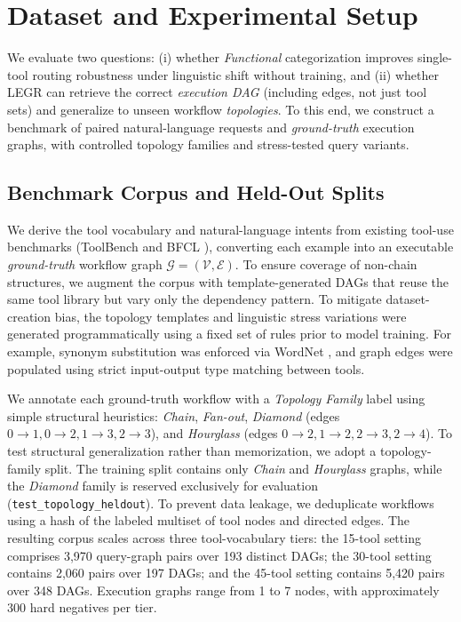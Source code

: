 \documentclass{article}
\begin{document}
\section{Dataset and Experimental Setup}

We evaluate two questions: (i) whether \emph{Functional} categorization improves single-tool routing robustness under linguistic shift without training, and (ii) whether LEGR can retrieve the correct \emph{execution DAG} (including edges, not just tool sets) and generalize to unseen workflow \emph{topologies}. To this end, we construct a benchmark of paired natural-language requests and \emph{ground-truth} execution graphs, with controlled topology families and stress-tested query variants.

\subsection{Benchmark Corpus and Held-Out Splits}
We derive the tool vocabulary and natural-language intents from existing tool-use benchmarks (ToolBench \cite{qin2023toolllm} and BFCL \cite{yan2024berkeley}), converting each example into an executable \emph{ground-truth} workflow graph $\mathcal{G}=(\mathcal{V},\mathcal{E})$. To ensure coverage of non-chain structures, we augment the corpus with template-generated DAGs that reuse the same tool library but vary only the dependency pattern. To mitigate dataset-creation bias, the topology templates and linguistic stress variations were generated programmatically using a fixed set of rules prior to model training. For example, synonym substitution was enforced via WordNet \cite{miller1995wordnet}, and graph edges were populated using strict input-output type matching between tools.

We annotate each ground-truth workflow with a \textit{Topology Family} label using simple structural heuristics: \textit{Chain}, \textit{Fan-out}, \textit{Diamond} (edges $0\to1, 0\to2, 1\to3, 2\to3$), and \textit{Hourglass} (edges $0\to2, 1\to2, 2\to3, 2\to4$). To test structural generalization rather than memorization, we adopt a topology-family split. The training split contains only \textit{Chain} and \textit{Hourglass} graphs, while the \textit{Diamond} family is reserved exclusively for evaluation (\texttt{test\_topology\_heldout}). To prevent data leakage, we deduplicate workflows using a hash of the labeled multiset of tool nodes and directed edges. The resulting corpus scales across three tool-vocabulary tiers: the 15-tool setting comprises 3,970 query-graph pairs over 193 distinct DAGs; the 30-tool setting contains 2,060 pairs over 197 DAGs; and the 45-tool setting contains 5,420 pairs over 348 DAGs. Execution graphs range from 1 to 7 nodes, with approximately 300 hard negatives per tier.
\end{document}
